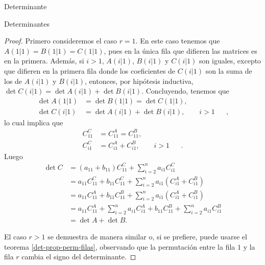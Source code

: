 \documentclass[a4paper,12pt,twoside,spanish]{amsbook}
\theoremstyle{definition}
\theoremstyle{remark}
\begin{document}
\begin{chapter}{Determinante}
\begin{section}{Determinantes}
\begin{proof}
			Primero consideremos el caso $r = 1$. En  este caso tenemos que  $A(1|1) =B(1|1) = C(1|1)$, pues en la única fila que difieren las matrices es en la primera. Además, si $i>1$,  $A(i|1)$,  $B(i|1)$ y $C(i|1)$ son iguales, excepto que difieren en la primera fila donde los coeficientes de $C(i|1)$ son la suma de los de  $A(i|1)$ y  $B(i|1)$,  entonces, por hipótesis inductiva, 
			$\det C(i|1) = \det A(i|1) + \det B(i|1)$. Concluyendo, tenemos que
			\begin{align*}
			\det A(1|1) &=\det B(1|1) =\det  C(1|1),&& \\ \det C(i|1) &= \det A(i|1) + \det B(i|1), \qquad i>1&&,
			\end{align*}
			lo cual implica que 
			\begin{align*}
			C^C_{11}&= C^A_{11} = C^B_{11} ,&& \\ C^C_{i1} &= C^A_{i1} + C^B_{i1}, \qquad i>1&&.
			\end{align*}
			Luego
			\begin{align*}
			\det C &= (a_{11}+b_{11}) C^C_{11} + \sum_{i=2}^{n} a _{i1}C^C_{i1} \\
			&= a_{11} C^C_{11} + b_{11}  C^C_{11}+ \sum_{i=2}^{n} a _{i1}( C^A_{i1} + C^B_{i1}) \\
			&= a_{11} C^A_{11} + b_{11}  C^B_{11}+ \sum_{i=2}^{n} a _{i1}( C^A_{i1} + C^B_{i1}) \\
			&= a_{11} C^A_{11} +\sum_{i=2}^{n} a _{i1}C^A_{i1} + b_{11}  C^B_{11}+ \sum_{i=2}^{n} a _{i1} C^B_{i1}\\
			&= \det A + \det B.
			\end{align*}
			
			El caso $r >1$ se demuestra de manera similar o,  si se prefiere, puede usarse el teorema \ref{det-prop-perm-filas}, observando que la permutación entre la fila $1$ y la fila $r$ cambia el signo del determinante.  
		\end{proof}
	

\end{section}
\end{chapter}
\end{document}
